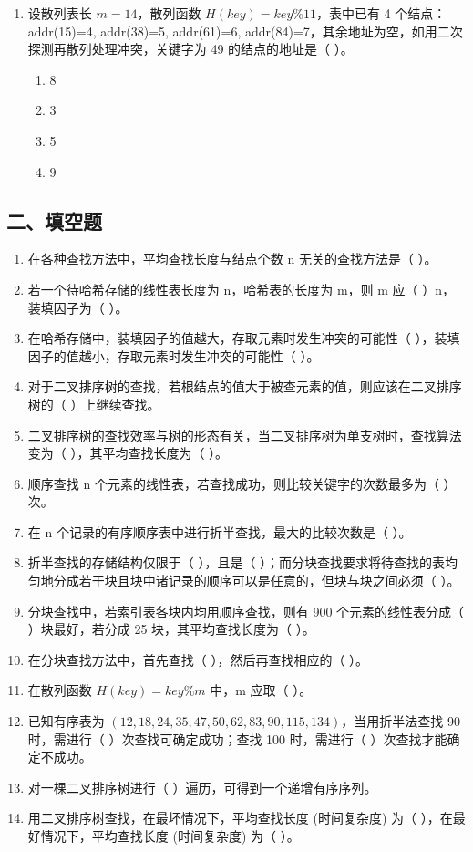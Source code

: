 \documentclass[12pt, a4paper]{article}
\begin{document}
\begin{enumerate}
    \item 设散列表长 $m=14$，散列函数 $H(key)=key \% 11$，表中已有 4 个结点：addr(15)=4, addr(38)=5, addr(61)=6, addr(84)=7，其余地址为空，如用二次探测再散列处理冲突，关键字为 49 的结点的地址是（ ）。
    \begin{enumerate}
        \item[A.] 8
        \item[B.] 3
        \item[C.] 5
        \item[D.] 9
    \end{enumerate}
\end{enumerate}

\subsection*{二、填空题}
\begin{enumerate}
    \item 在各种查找方法中，平均查找长度与结点个数 n 无关的查找方法是（ ）。
    \item 若一个待哈希存储的线性表长度为 n，哈希表的长度为 m，则 m 应（ ）n，装填因子为（ ）。
    \item 在哈希存储中，装填因子的值越大，存取元素时发生冲突的可能性（ ），装填因子的值越小，存取元素时发生冲突的可能性（ ）。
    \item 对于二叉排序树的查找，若根结点的值大于被查元素的值，则应该在二叉排序树的（ ）上继续查找。
    \item 二叉排序树的查找效率与树的形态有关，当二叉排序树为单支树时，查找算法变为（ ），其平均查找长度为（ ）。
    \item 顺序查找 n 个元素的线性表，若查找成功，则比较关键字的次数最多为（ ）次。
    \item 在 n 个记录的有序顺序表中进行折半查找，最大的比较次数是（ ）。
    \item 折半查找的存储结构仅限于（ ），且是（ ）；而分块查找要求将待查找的表均匀地分成若干块且块中诸记录的顺序可以是任意的，但块与块之间必须（ ）。
    \item 分块查找中，若索引表各块内均用顺序查找，则有 900 个元素的线性表分成（ ）块最好，若分成 25 块，其平均查找长度为（ ）。
    \item 在分块查找方法中，首先查找（ ），然后再查找相应的（ ）。
    \item 在散列函数 $H(key)=key \% m$ 中，m 应取（ ）。
    \item 已知有序表为 $(12, 18, 24, 35, 47, 50, 62, 83, 90, 115, 134)$，当用折半法查找 90 时，需进行（ ）次查找可确定成功；查找 100 时，需进行（ ）次查找才能确定不成功。
    \item 对一棵二叉排序树进行（ ）遍历，可得到一个递增有序序列。
    \item 用二叉排序树查找，在最坏情况下，平均查找长度 (时间复杂度) 为（ ），在最好情况下，平均查找长度 (时间复杂度) 为（ ）。
\end{enumerate}
\end{document}
